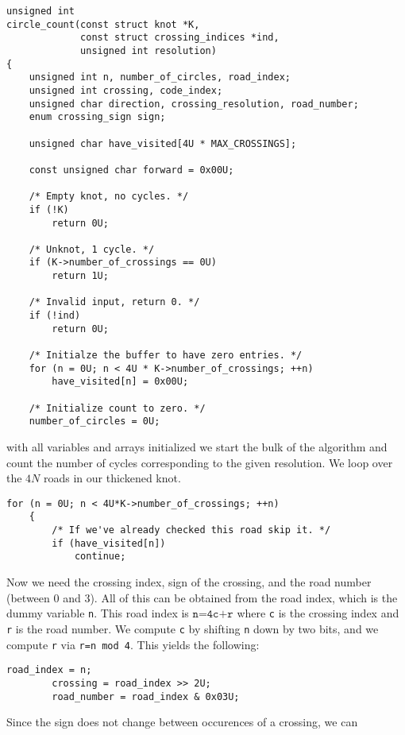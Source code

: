 \begin{lstlisting}[style=CStyle]
unsigned int
circle_count(const struct knot *K,
             const struct crossing_indices *ind,
             unsigned int resolution)
{
    unsigned int n, number_of_circles, road_index;
    unsigned int crossing, code_index;
    unsigned char direction, crossing_resolution, road_number;
    enum crossing_sign sign;

    unsigned char have_visited[4U * MAX_CROSSINGS];

    const unsigned char forward = 0x00U;

    /* Empty knot, no cycles. */
    if (!K)
        return 0U;

    /* Unknot, 1 cycle. */
    if (K->number_of_crossings == 0U)
        return 1U;

    /* Invalid input, return 0. */
    if (!ind)
        return 0U;

    /* Initialze the buffer to have zero entries. */
    for (n = 0U; n < 4U * K->number_of_crossings; ++n)
        have_visited[n] = 0x00U;

    /* Initialize count to zero. */
    number_of_circles = 0U;
\end{lstlisting}
        with all variables and arrays initialized we start the bulk of the
        algorithm and count the number of cycles corresponding to the given
        resolution. We loop over the $4N$ roads in our thickened knot.
\begin{lstlisting}[style=CStyle, firstnumber = 34]
    for (n = 0U; n < 4U*K->number_of_crossings; ++n)
    {
        /* If we've already checked this road skip it. */
        if (have_visited[n])
            continue;
\end{lstlisting}
        Now we need the crossing index, sign of the crossing, and the road
        number (between 0 and 3). All of this can be obtained from the road
        index, which is the dummy variable \texttt{n}. This road index is
        $\texttt{n=4c+r}$ where \texttt{c} is the crossing index and
        \texttt{r} is the road number. We compute \texttt{c} by shifting
        \texttt{n} down by two bits, and we compute \texttt{r} via
        \texttt{r=n mod 4}. This yields the following:
\begin{lstlisting}[style=CStyle, firstnumber = 40]
        road_index = n;
        crossing = road_index >> 2U;
        road_number = road_index & 0x03U;
\end{lstlisting}
        Since the sign does not change between occurences of a crossing, we can
